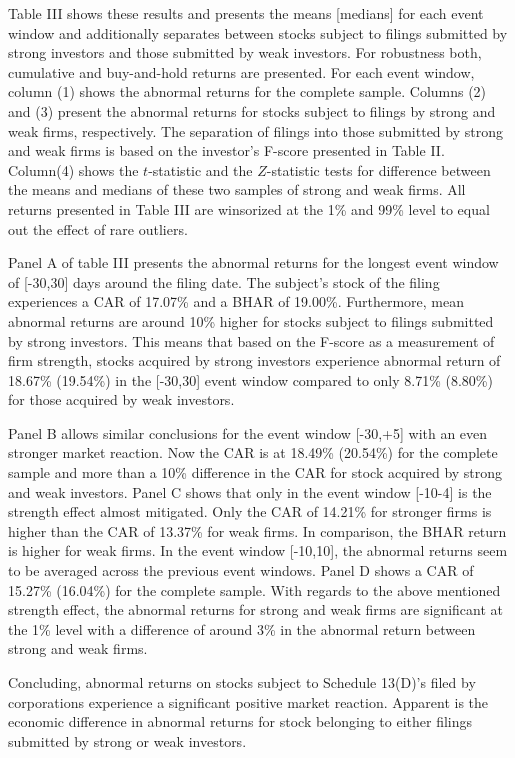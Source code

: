\documentclass[12pt]{article}
\begin{document}
Table III shows these results and presents the means [medians] for each event window and additionally separates between stocks subject to filings submitted by strong investors and those submitted by weak investors. For robustness both, cumulative and buy-and-hold returns are presented. For each event window, column (1) shows the abnormal returns for the complete sample. Columns (2) and (3) present the abnormal returns for stocks subject to filings by strong and weak firms, respectively. The separation of filings into those submitted by strong and weak firms is based on the investor's F-score presented in Table II. Column(4) shows the $t$-statistic and the $Z$-statistic tests for difference between the means and medians of these two samples of strong and weak firms. All returns presented in Table III are winsorized at the 1\% and 99\% level to equal out the effect of rare outliers. 

Panel A of table III presents the abnormal returns for the longest event window of [-30,30] days around the filing date. The subject's stock of the filing experiences a CAR of 17.07\% and a BHAR of 19.00\%. Furthermore, mean abnormal returns are around 10\% higher for stocks subject to filings submitted by strong investors. This means that based on the F-score as a measurement of firm strength, stocks acquired by strong investors experience abnormal return of 18.67\% (19.54\%) in the [-30,30] event window compared to only 8.71\% (8.80\%) for those acquired by weak investors. 

Panel B allows similar conclusions for the event window [-30,+5] with an even stronger market reaction. Now the CAR is at 18.49\% (20.54\%) for the complete sample and more than a 10\% difference in the CAR for stock acquired by strong and weak investors.
Panel C shows that only in the event window [-10-4] is the strength effect almost mitigated. Only the CAR of 14.21\% for stronger firms is higher than the CAR of 13.37\% for weak firms. In comparison, the BHAR return is higher for weak firms. 
In the event window [-10,10], the abnormal returns seem to be averaged across the previous event windows. Panel D shows a CAR of 15.27\%  (16.04\%) for the complete sample. With regards to the above mentioned strength effect, the abnormal returns for strong and weak firms are significant at the 1\% level with a difference of around 3\% in the abnormal return between strong and weak firms. 

Concluding, abnormal returns on stocks subject to Schedule 13(D)'s filed by corporations experience a significant positive market reaction. Apparent is the economic difference in abnormal returns for stock belonging to either filings submitted by strong or weak investors. 
\end{document}
